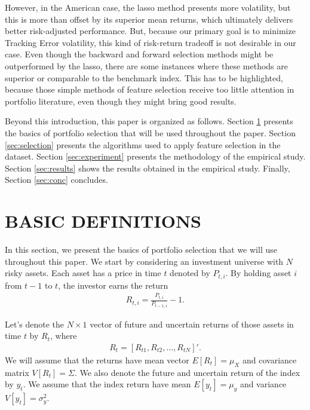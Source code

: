 \documentclass[12pt,oneside,a4paper]{memoir}
\begin{document}
However, in the American case, the lasso method presents more volatility, but this is more than offset by its superior mean returns, which ultimately delivers better risk-adjusted performance.
But, because our primary goal is to minimize Tracking Error volatility, this kind of risk-return tradeoff is not desirable in our case.
Even though the backward and forward selection methods might be outperformed by the lasso, there are some instances where these methods are superior or comparable to the benchmark index. 
This has to be highlighted, because those simple methods of feature selection receive too little attention in portfolio literature, even though they might bring good results.


Beyond this introduction, this paper is organized as follows.
Section \ref{sec:defs} presents the basics of portfolio selection that will be used throughout the paper.
Section \ref{sec:selection} presents the algorithms used to apply feature selection in the dataset.
Section \ref{sec:experiment} presents the methodology of the empirical study.
Section \ref{sec:results} shows the results obtained in the empirical study.
Finally, Section \ref{sec:conc} concludes.

\section{BASIC DEFINITIONS} \label{sec:defs}

In this section, we present the basics of portfolio selection that we will use throughout this paper.
We start by considering an investment universe with $N$ risky assets.
Each asset has a price in time $t$ denoted by $P_{t,i}$.
By holding asset $i$ from $t-1$ to $t$, the investor earns the return
\begin{align} \label{eq:ret}
	R_{t,i} = \frac{P_{t,i}}{P_{t-1,i}} - 1.
\end{align}

Let's  denote the $N\times1$ vector of future and uncertain returns of those assets in time $t$ by $R_{t}$, where 
\begin{align*} %
	R_{t} =  [R_{t1}, R_{t2} , \dots, R_{tN}]'.
\end{align*}
We will assume that the returns have mean vector $E[R_{t}] =\mu_{X}$ and covariance matrix $V[R_{t}] =\Sigma$.
We also denote the future and uncertain return of the index by $y_{t}$.
We assume that the index return have mean $E[y_{t}] = \mu_{y}$ and variance $V[y_{t}]=\sigma^2_{y}$.
\end{document}
